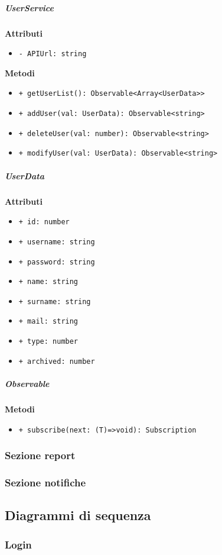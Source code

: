 \subparagraph{UserService}
\textbf{Attributi}
\begin{itemize}
	\item \texttt{- APIUrl: string}
\end{itemize}
\textbf{Metodi}
\begin{itemize}
	\item \texttt{+ getUserList(): Observable<Array<UserData>>}
	\item \texttt{+ addUser(val: UserData): Observable<string>}
	\item \texttt{+ deleteUser(val: number): Observable<string>}
	\item \texttt{+ modifyUser(val: UserData): Observable<string>}
\end{itemize}
\subparagraph{UserData}
\textbf{Attributi}
\begin{itemize}
	\item \texttt{+ id: number}
	\item \texttt{+ username: string}
	\item \texttt{+ password: string}
	\item \texttt{+ name: string}
	\item \texttt{+ surname: string}
	\item \texttt{+ mail: string}
	\item \texttt{+ type: number}
	\item \texttt{+ archived: number}
\end{itemize}
\subparagraph{Observable}
\textbf{Metodi}
\begin{itemize}
	\item \texttt{+ subscribe(next: (T)=>void): Subscription}
\end{itemize}

\subsubsection{Sezione report}
\subsubsection{Sezione notifiche}
\subsection{Diagrammi di sequenza}
\subsubsection{Login}

